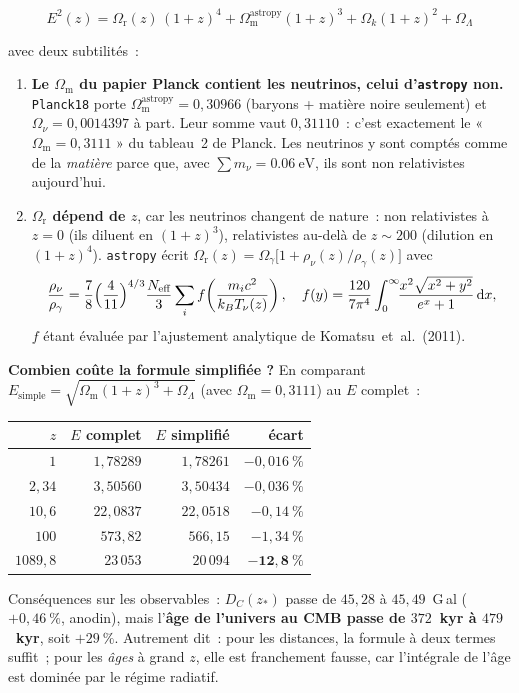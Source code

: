 \documentclass[11pt,a4paper,openany]{report}
\newcommand{\dif}{\mathrm{d}}
\newcommand{\Om}{\Omega_{\mathrm{m}}}
\newcommand{\Or}{\Omega_{\mathrm{r}}}
\newcommand{\OL}{\Omega_{\Lambda}}
\newcommand{\Ok}{\Omega_{k}}
\begin{document}
\begin{equation}
\boxed{\;E^{2}(z) = \Or(z)\,(1+z)^{4} + \Om^{\text{astropy}}(1+z)^{3}
       + \Ok(1+z)^{2} + \OL\;}
\label{eq:E_complet}
\end{equation}

\noindent avec deux subtilités~:

\begin{enumerate}[topsep=3pt]
\item \textbf{Le $\Om$ du papier Planck contient les neutrinos, celui
d'\texttt{astropy} non.} \texttt{Planck18} porte
$\Om^{\text{astropy}} = 0{,}30966$ (baryons + matière noire seulement) et
$\Omega_{\nu} = 0{,}0014397$ à part. Leur somme vaut $0{,}31110$~: c'est
exactement le « $\Om = 0{,}3111$ » du tableau~2 de Planck. Les neutrinos y sont
comptés comme de la \emph{matière} parce que, avec $\sum m_{\nu} =
\SI{0.06}{\electronvolt}$, ils sont non relativistes aujourd'hui.

\item \textbf{$\Or$ dépend de $z$}, car les neutrinos changent de nature~:
non relativistes à $z=0$ (ils diluent en $(1+z)^{3}$), relativistes au-delà de
$z \sim 200$ (dilution en $(1+z)^{4}$). \texttt{astropy} écrit
$\Or(z) = \Omega_{\gamma}\bigl[1 + \rho_{\nu}(z)/\rho_{\gamma}(z)\bigr]$ avec
\[
\frac{\rho_{\nu}}{\rho_{\gamma}} = \frac{7}{8}\Bigl(\frac{4}{11}\Bigr)^{4/3}
\frac{N_{\text{eff}}}{3}\sum_{i} f\!\left(\frac{m_{i}c^{2}}{k_{B}T_{\nu}(z)}\right),
\quad
f(y) = \frac{120}{7\pi^{4}}\int_{0}^{\infty}\!\!
       \frac{x^{2}\sqrt{x^{2}+y^{2}}}{e^{x}+1}\,\dif x ,
\]
$f$ étant évaluée par l'ajustement analytique de Komatsu~et~al.~(2011).
\end{enumerate}

\begin{tcolorbox}[numerique]
\textbf{Combien coûte la formule simplifiée ?} En comparant
$E_{\text{simple}} = \sqrt{\Om(1+z)^{3}+\OL}$ (avec $\Om = 0{,}3111$) au
$E$ complet~:

\medskip
\begin{tabular}{rrrr}
\toprule
$z$ & $E$ complet & $E$ simplifié & écart \\
\midrule
$1$      & $1{,}78289$   & $1{,}78261$   & $-0{,}016~\%$ \\
$2{,}34$ & $3{,}50560$   & $3{,}50434$   & $-0{,}036~\%$ \\
$10{,}6$ & $22{,}0837$   & $22{,}0518$   & $-0{,}14~\%$ \\
$100$    & $573{,}82$    & $566{,}15$    & $-1{,}34~\%$ \\
$1089{,}8$ & $23\,053$   & $20\,094$     & $\mathbf{-12{,}8~\%}$ \\
\bottomrule
\end{tabular}

\medskip
Conséquences sur les observables~: $D_{C}(z_{*})$ passe de $45{,}28$ à
$45{,}49$~G\,al ($+0{,}46~\%$, anodin), mais l'\textbf{âge de l'univers au
CMB passe de $372$~kyr à $479$~kyr}, soit $+29~\%$. Autrement dit~: pour les
distances, la formule à deux termes suffit~; pour les \emph{âges} à grand $z$,
elle est franchement fausse, car l'intégrale de l'âge est dominée par le
régime radiatif.
\end{tcolorbox}
\end{document}
